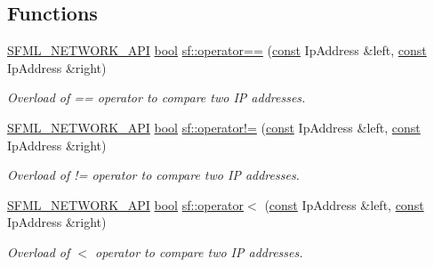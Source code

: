 \subsection*{Functions}
\begin{DoxyCompactItemize}
\item 
\hyperlink{sfml_2dep_2_s_f_m_l-2_84_82_2include_2_s_f_m_l_2_network_2_export_8hpp_ac5d46d4ffd98e947e28c54d051b338e7}{S\-F\-M\-L\-\_\-\-N\-E\-T\-W\-O\-R\-K\-\_\-\-A\-P\-I} \hyperlink{term__entry_8h_a002004ba5d663f149f6c38064926abac}{bool} \hyperlink{namespacesf_ac911326160206c1038ceff6face28b89}{sf\-::operator==} (\hyperlink{term__entry_8h_a57bd63ce7f9a353488880e3de6692d5a}{const} Ip\-Address \&left, \hyperlink{term__entry_8h_a57bd63ce7f9a353488880e3de6692d5a}{const} Ip\-Address \&right)
\begin{DoxyCompactList}\small\item\em Overload of == operator to compare two I\-P addresses. \end{DoxyCompactList}\item 
\hyperlink{sfml_2dep_2_s_f_m_l-2_84_82_2include_2_s_f_m_l_2_network_2_export_8hpp_ac5d46d4ffd98e947e28c54d051b338e7}{S\-F\-M\-L\-\_\-\-N\-E\-T\-W\-O\-R\-K\-\_\-\-A\-P\-I} \hyperlink{term__entry_8h_a002004ba5d663f149f6c38064926abac}{bool} \hyperlink{namespacesf_ad68fc42c15ea415b59023a4a277f8946}{sf\-::operator!=} (\hyperlink{term__entry_8h_a57bd63ce7f9a353488880e3de6692d5a}{const} Ip\-Address \&left, \hyperlink{term__entry_8h_a57bd63ce7f9a353488880e3de6692d5a}{const} Ip\-Address \&right)
\begin{DoxyCompactList}\small\item\em Overload of != operator to compare two I\-P addresses. \end{DoxyCompactList}\item 
\hyperlink{sfml_2dep_2_s_f_m_l-2_84_82_2include_2_s_f_m_l_2_network_2_export_8hpp_ac5d46d4ffd98e947e28c54d051b338e7}{S\-F\-M\-L\-\_\-\-N\-E\-T\-W\-O\-R\-K\-\_\-\-A\-P\-I} \hyperlink{term__entry_8h_a002004ba5d663f149f6c38064926abac}{bool} \hyperlink{namespacesf_a62e90a478e790defc429ecd94ad67ab3}{sf\-::operator$<$} (\hyperlink{term__entry_8h_a57bd63ce7f9a353488880e3de6692d5a}{const} Ip\-Address \&left, \hyperlink{term__entry_8h_a57bd63ce7f9a353488880e3de6692d5a}{const} Ip\-Address \&right)
\begin{DoxyCompactList}\small\item\em Overload of $<$ operator to compare two I\-P addresses. \end{DoxyCompactList}\item 

\end{DoxyCompactItemize}
